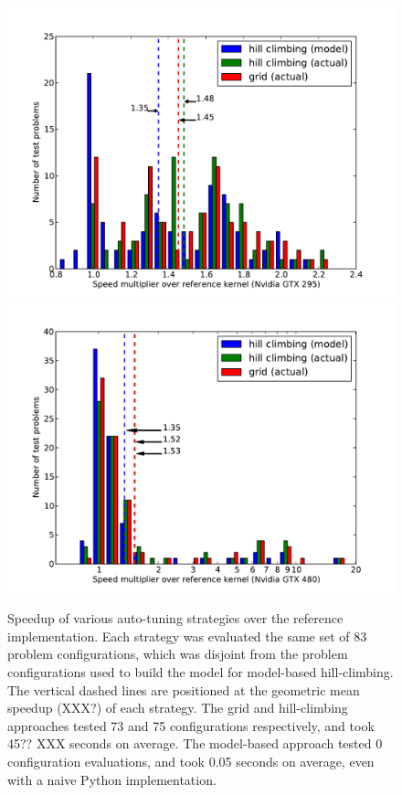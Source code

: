 \documentclass{sig-alternate}
\begin{document}
\begin{figure}
\centering
\includegraphics[scale=.42]{speedup_295.pdf}
\includegraphics[scale=.42]{speedup_480.pdf}
\caption{Speedup of various auto-tuning strategies over the reference
implementation.
Each strategy was evaluated the same set of 83 problem configurations, which
was disjoint from the problem configurations used to build the model for
model-based hill-climbing.
The vertical dashed lines are positioned at the geometric mean speedup (XXX?)
of each strategy. The grid and hill-climbing approaches
tested 73 and 75 configurations respectively, and took 45?? XXX
seconds on average.
The model-based approach tested 0 configuration evaluations, and took 0.05
seconds on average, even with a naive Python implementation.
}
\label{fig:speedup}
\end{figure}
\end{document}
